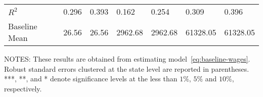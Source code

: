 \begin{table}[H]
\begin{tabular}{@{}lllllll@{}}
        $R^2$            & 0.296     & 0.393     & 0.162     & 0.254     & 0.309     & 0.396     \\
        Baseline Mean    & 26.56     & 26.56     & 2962.68   & 2962.68   & 61328.05  & 61328.05  \\ \bottomrule \bottomrule
    \end{tabular}
    \begin{minipage}{\columnwidth}
        \vspace{0.05in}
        \tiny NOTES: These results are obtained from estimating model~\ref{eq:baseline-wages}. Robust standard errors clustered at the state level are reported in parentheses. ***, **, and * denote significance levels at the less than $1\%$, $5\%$ and $10\%$, respectively.
    \end{minipage}
\end{table}